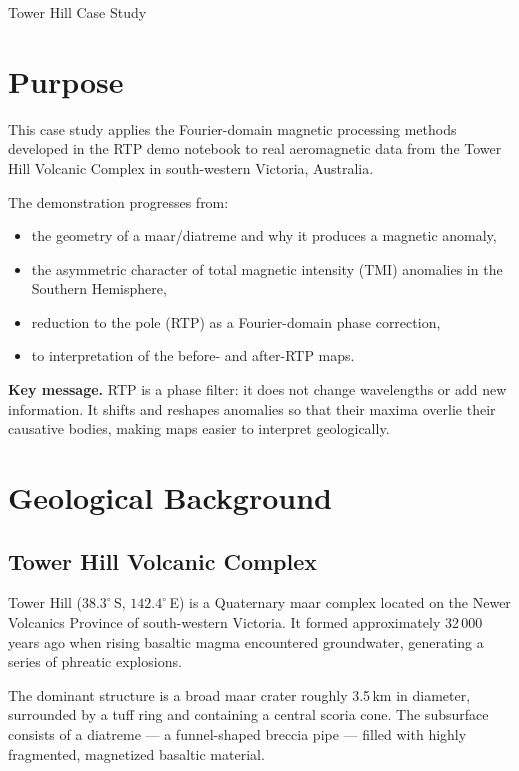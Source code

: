 \begin{activity}{Tower Hill Case Study}

\section{Purpose}

This case study applies the Fourier-domain magnetic processing methods developed in the RTP demo notebook to real aeromagnetic data from the Tower Hill Volcanic Complex in south-western Victoria, Australia.

The demonstration progresses from:
\begin{itemize}
  \item the geometry of a maar/diatreme and why it produces a magnetic anomaly,
  \item the asymmetric character of total magnetic intensity (TMI) anomalies
        in the Southern Hemisphere,
  \item reduction to the pole (RTP) as a Fourier-domain phase correction,
  \item to interpretation of the before- and after-RTP maps.
\end{itemize}

\noindent\textbf{Key message.}
RTP is a phase filter: it does not change wavelengths or add new information.
It shifts and reshapes anomalies so that their maxima overlie their causative
bodies, making maps easier to interpret geologically.

\section{Geological Background}

\subsection{Tower Hill Volcanic Complex}

Tower Hill ($38.3^\circ$\,S, $142.4^\circ$\,E) is a Quaternary maar complex
located on the Newer Volcanics Province of south-western Victoria.
It formed approximately 32\,000 years ago when rising basaltic magma
encountered groundwater, generating a series of phreatic explosions.

The dominant structure is a broad maar crater roughly 3.5\,km in diameter,
surrounded by a tuff ring and containing a central scoria cone.
The subsurface consists of a diatreme --- a funnel-shaped breccia pipe ---
filled with highly fragmented, magnetized basaltic material.


\end{activity}
